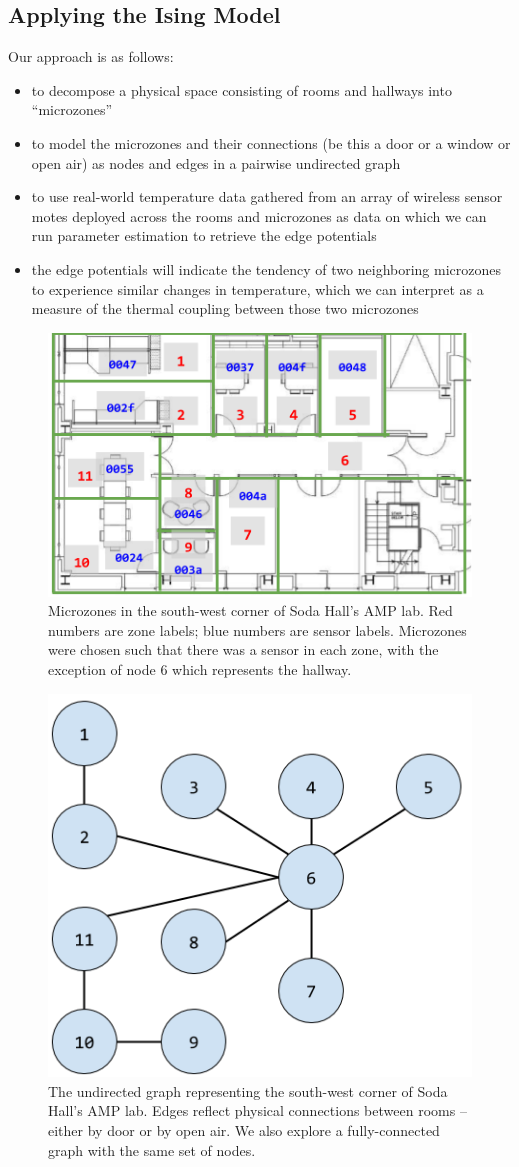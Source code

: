 \subsection{Applying the Ising Model}

Our approach is as follows:

\begin{itemize}
\item to decompose a physical space consisting of rooms and hallways into ``microzones''
\item to model the microzones and their connections (be this a door or a window or open air) as nodes and edges in a pairwise undirected graph
\item to use real-world temperature data gathered from an array of wireless sensor motes deployed across the rooms and microzones as data on which we can run parameter estimation to retrieve the edge potentials
\item the edge potentials will indicate the tendency of two neighboring microzones to experience similar changes in temperature, which we can interpret as a measure of the thermal coupling between those two microzones
\end{itemize}

\begin{figure}
\centering
\includegraphics[width=.5\linewidth]{figs/Soda_AMP_microzones}
\caption{Microzones in the south-west corner of Soda Hall's AMP lab. Red numbers are zone labels; blue numbers are sensor labels. Microzones were chosen such that there was a sensor in each zone, with the exception of node 6 which represents the hallway.}
\label{fig:soda_amp_microzones}
\end{figure}


\begin{figure}
\centering
\includegraphics[width=.5\linewidth]{figs/SodaEdgeGraph}
\caption{The undirected graph representing the south-west corner of Soda Hall's AMP lab. Edges reflect physical connections between rooms -- either by door or by open air. We also explore a fully-connected graph with the same set of nodes.}
\label{fig:physical_soda_edges}
\end{figure}

